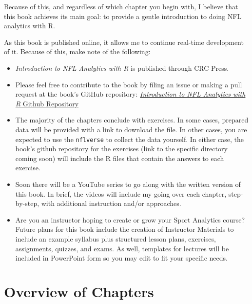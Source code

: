 \documentclass[
  letterpaper,
]{krantz}
\begin{document}
Because of this, and regardless of which chapter you begin with, I
believe that this book achieves its main goal: to provide a gentle
introduction to doing NFL analytics with R.

As this book is published online, it allows me to continue real-time
development of it. Because of this, make note of the following:

\begin{itemize}
\item
  \emph{Introduction to NFL Analytics with R} is published through CRC
  Press.
\item
  Please feel free to contribute to the book by filing an issue or
  making a pull request at the book's GitHub repository:
  \href{https://github.com/bcongelio/nfl-analytics-with-r-book}{\emph{Introduction
  to NFL Analytics with R} Github Repository}
\item
  The majority of the chapters conclude with exercises. In some cases,
  prepared data will be provided with a link to download the file. In
  other cases, you are expected to use the \texttt{nflverse} to collect
  the data yourself. In either case, the book's github repository for
  the exercises (link to the specific directory coming soon) will
  include the R files that contain the answers to each exercise.
\item
  Soon there will be a YouTube series to go along with the written
  version of this book. In brief, the videos will include my going over
  each chapter, step-by-step, with additional instruction and/or
  approaches.
\item
  Are you an instructor hoping to create or grow your Sport Analytics
  course? Future plans for this book include the creation of Instructor
  Materials to include an example syllabus plus structured lesson plans,
  exercises, assignments, quizzes, and exams. As well, templates for
  lectures will be included in PowerPoint form so you may edit to fit
  your specific needs.
\end{itemize}

\hypertarget{overview-of-chapters}{%
\section{Overview of Chapters}\label{overview-of-chapters}}
\end{document}
